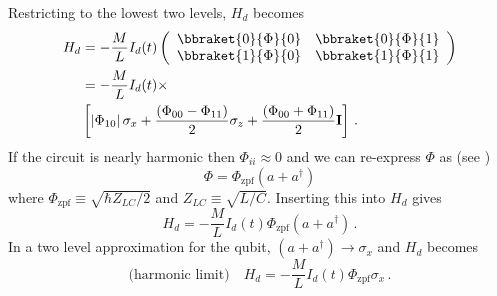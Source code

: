 Restricting to the lowest two levels, $H_d$ becomes
\begin{align}
H_d
&= - \frac{M}{L} I_d(t) \left(
{\begin{array}{cc} \bbraket{0}{\Phi}{0} & \bbraket{0}{\Phi}{1} \\ \bbraket{1}{\Phi}{0} & \bbraket{1}{\Phi}{1} \end{array}}
\right) \\
&= - \frac{M}{L} I_d(t) \times \nonumber \\
&\left[
\left| \Phi_{10} \right| \sigma_x
+ \frac{(\Phi_{00} - \Phi_{11})}{2} \sigma_z
+ \frac{(\Phi_{00} + \Phi_{11})}{2} \mathbf{I}
\right] \, .
\end{align}
If the circuit is nearly harmonic then $\Phi_{ii} \approx 0$ and we can re-express $\Phi$ as (see \citeinternaltype {})
\begin{equation}
\Phi = \Phi_{\text{zpf}} \left( a + a^\dagger \right)
\end{equation}
where $\Phi_{\text{zpf}} \equiv \sqrt{\hbar Z_{LC} / 2}$ and $Z_{LC} \equiv \sqrt{L/C}$.
Inserting this into $H_d$ gives
\begin{equation}
H_d = -\frac{M}{L} I_d(t) \Phi_{\text{zpf}} (a + a^\dagger) \, .
\end{equation}
In a two level approximation for the qubit, $(a + a^\dagger)\rightarrow \sigma_x$ and $H_d$ becomes
\begin{equation}
\text{(harmonic limit)} \quad H_d = - \frac{M}{L} I_d(t) \Phi_{\text{zpf}} \sigma_x \, .
\end{equation}
